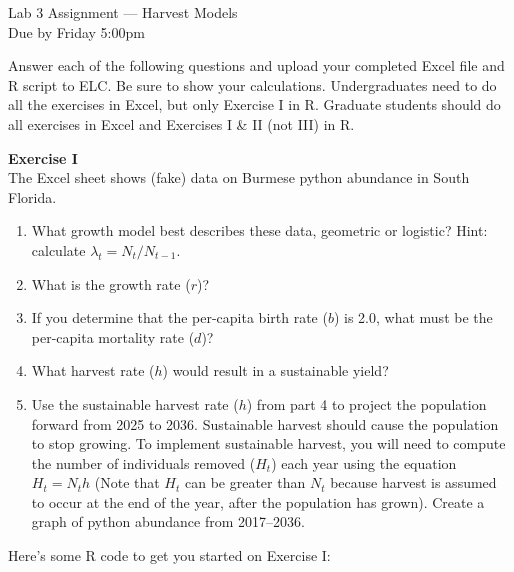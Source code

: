 \documentclass[12pt]{article}\usepackage[]{graphicx}\usepackage[]{xcolor}
\begin{document}
{
  \Large
  \centering
  Lab 3 Assignment --- Harvest Models \\
  Due by Friday 5:00pm \par
}

Answer each of the following questions and upload your completed Excel
file and R script to ELC. Be sure to show your calculations. Undergraduates
need to do all the exercises in Excel, but only Exercise I in
R. Graduate students should do all exercises in Excel and Exercises I \& II (not III) in R.  

\vspace{12pt}

{\bf Exercise I \\}
The Excel sheet shows (fake) data on Burmese python abundance in South Florida.
\begin{enumerate}
  \item What growth model best describes these data, geometric or
    logistic?  Hint: calculate $\lambda_t = N_t/N_{t-1}$.
  \item What is the growth rate ($r$)?
  \item If you determine that the per-capita birth rate ($b$) is 2.0,
    what must be the per-capita mortality rate ($d$)?
  \item What harvest rate ($h$) would result in a sustainable yield?
  \item Use the sustainable harvest rate ($h$) from part 4 to project
    the population forward from 2025 to 2036. Sustainable harvest
    should cause the population to stop growing. To implement
    sustainable harvest, you will need to compute the number of
    individuals removed ($H_t$) each year using the equation
    $H_t=N_{t}h$ (Note that $H_t$ can be greater than $N_t$ because
    harvest is assumed to occur at the end of the year, after the 
    population has grown). Create a graph of python abundance from 
    2017--2036.  
\end{enumerate}

\vspace{24pt}

Here's some R code to get you started on Exercise I:
\end{document}
